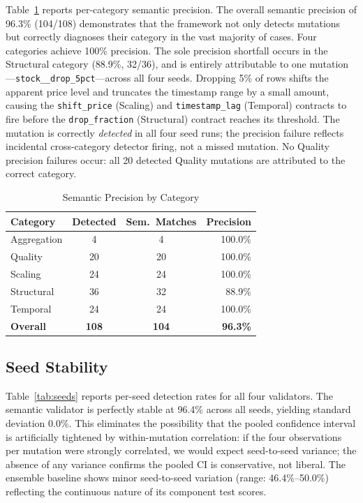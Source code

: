 \documentclass[journal]{IEEEtran}
\newcommand{\mut}[1]{\mbox{\texttt{#1}}}
\begin{document}
Table~\ref{tab:precision} reports per-category semantic precision.  The overall semantic precision of 96.3\% (104/108) demonstrates that the
framework not only detects mutations but correctly diagnoses their category
in the vast majority of cases.  Four categories achieve 100\% precision.
The sole precision shortfall occurs in the Structural category (88.9\%,
32/36), and is entirely attributable to one mutation---\mut{stock\_\_drop\_5pct}---across
all four seeds.  Dropping 5\% of rows shifts the apparent price level
and truncates the timestamp range by a small amount, causing the
\texttt{shift\_price} (Scaling) and \texttt{timestamp\_lag} (Temporal)
contracts to fire before the \texttt{drop\_fraction} (Structural) contract
reaches its threshold.  The mutation is correctly \emph{detected} in all
four seed runs; the precision failure reflects incidental cross-category
detector firing, not a missed mutation.  No Quality precision failures
occur: all 20 detected Quality mutations are attributed to the correct
category.

\begin{table}[!t]
\renewcommand{\arraystretch}{1.25}
\caption{Semantic Precision by Category}
\label{tab:precision}
\centering
\begin{tabular}{lccr}
\toprule
\textbf{Category} & \textbf{Detected} & \textbf{Sem.\ Matches} &
  \textbf{Precision} \\
\midrule
Aggregation & 4   & 4   & 100.0\% \\
Quality     & 20  & 20  & 100.0\% \\
Scaling     & 24  & 24  & 100.0\% \\
Structural  & 36  & 32  & \phantom{0}88.9\% \\
Temporal    & 24  & 24  & 100.0\% \\
\midrule
\textbf{Overall} & \textbf{108} & \textbf{104} & \textbf{96.3\%} \\
\bottomrule
\end{tabular}
\end{table}

\subsection{Seed Stability}

Table~\ref{tab:seeds} reports per-seed detection rates for all four
validators.  The semantic validator is perfectly stable at 96.4\% across
all seeds, yielding standard deviation 0.0\%.  This eliminates the
possibility that the pooled confidence interval is artificially tightened
by within-mutation correlation: if the four observations per mutation were
strongly correlated, we would expect seed-to-seed variance; the absence of
any variance confirms the pooled CI is conservative, not liberal.  The ensemble baseline shows minor seed-to-seed variation 
(range: 46.4\%--50.0\%) reflecting the continuous nature 
of its component test scores.
\end{document}
